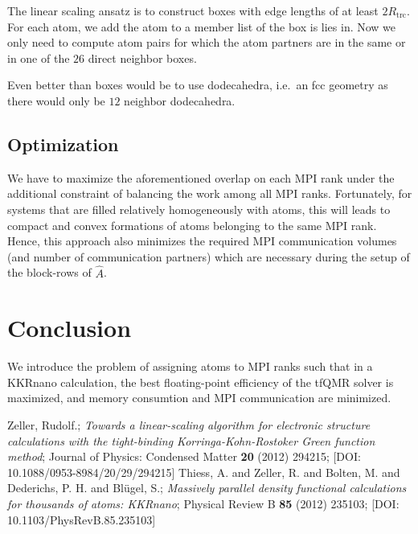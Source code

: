 \documentclass[a4paper]{article}
\newcommand{\MPIrank}{MPI rank} %
\newcommand{\um}[1]{_{\mathrm{#1}}}
\begin{document}
The linear scaling ansatz is to construct boxes with edge lengths of at least $2R\um{trc}$.
For each atom, we add the atom to a member list of the box is lies in.
Now we only need to compute atom pairs for which the atom partners are in the same or 
in one of the $26$ direct neighbor boxes.

Even better than boxes would be to use dodecahedra, 
i.e.~an fcc geometry as there would only be $12$ neighbor dodecahedra.

\subsection{Optimization}

We have to maximize the aforementioned overlap on each \MPIrank{}
under the additional constraint of balancing the work among all \MPIrank{}s.
Fortunately, for systems that are filled relatively homogeneously with atoms,
this will leads to compact and convex formations of atoms belonging to the same \MPIrank{}.
Hence, this approach also minimizes the required MPI communication volumes
(and number of communication partners)
which are necessary during the setup of the block-rows of $\hat A$.

\section{Conclusion}

We introduce the problem of assigning atoms to \MPIrank{}s
such that in a KKRnano calculation, 
the best floating-point efficiency of the tfQMR solver is maximized, and
memory consumtion and MPI communication are minimized.



\begin{thebibliography}{10}
 Zeller, Rudolf.;
   \textit{Towards a linear-scaling algorithm for electronic structure calculations with the tight-binding Korringa-Kohn-Rostoker {Green} function method};
    Journal of Physics: Condensed Matter \textbf{20} (2012) 294215;
    [DOI: 10.1088/0953-8984/20/29/294215]
 Thiess, A. and Zeller, R. and Bolten, M. and Dederichs, P. H. and Bl{\"u}gel, S.;
   \textit{Massively parallel density functional calculations for thousands of atoms: {KKRnano}};
    Physical Review B \textbf{85} (2012) 235103;
    [DOI: 10.1103/PhysRevB.85.235103]
\end{thebibliography}
\end{document}
